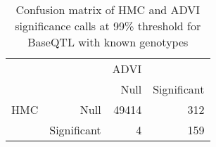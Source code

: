 \begin{table}[ht]
\centering
\caption{Confusion matrix of HMC and ADVI significance calls at 99\% threshold for BaseQTL with known genotypes} 
\label{tab:GT-xtab-99}
\begin{tabular}{rr|rr}
   &  & ADVI &  \\ 
    &   & Null & Significant \\ 
   \hline
HMC & Null & 49414 & 312 \\ 
    & Significant & 4 & 159 \\ 
  \end{tabular}
\end{table}
